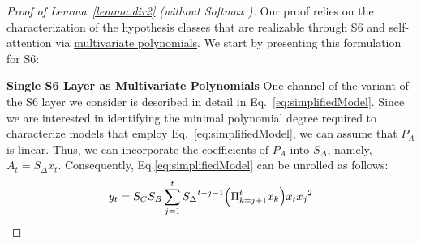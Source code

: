 \begin{proof}[Proof of Lemma~\ref{lemma:dir2} (without Softmax%
)]
Our proof relies on the characterization of the hypothesis classes that are realizable through S6 and self-attention via {\underline{multivariate polynomials}}. We start by presenting this formulation for S6:

\smallskip
\noindent\textbf{Single S6 Layer as Multivariate Polynomials\quad}
One channel of the variant of the S6 layer we consider is described in detail in Eq.~\ref{eq:simplifiedModel}.
%
%
%
Since we are interested in identifying the minimal polynomial degree required to characterize models that employ Eq.~\ref{eq:simplifiedModel}, we can assume that $P_A$ is linear. Thus, we can incorporate the coefficients of $P_A$ into $S_{\Delta}$, namely, $\bar{A}_t = S_{\Delta} x_t$. Consequently, Eq.\ref{eq:simplifiedModel} can be unrolled as follows:
{\small
\begin{equation}\label{eq:unrolledChanSl}
    y_{t}  %
    = S_C S_B  \sum_{j=1}^t {S_{\Delta}}^{t-j-1} \Big{(} {\Pi_{k=j+1}^t x_k  }\Big{)} x_t {x_j}^2 
\end{equation}
}


\end{proof}
